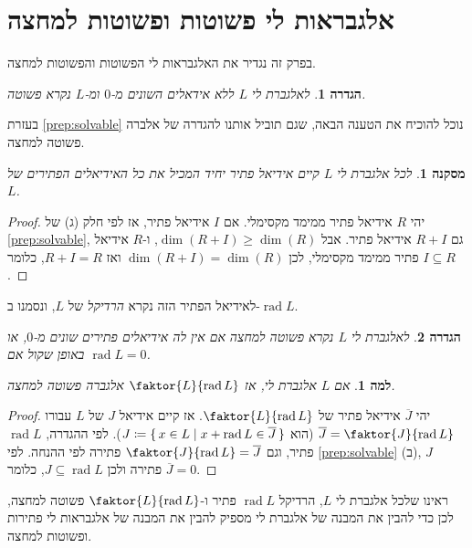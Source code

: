 \documentclass{report}
\theoremstyle{break}
\newtheorem{lemma}[lemma]{למה}
\newtheorem{definition}[definition]{הגדרה}
\newtheorem{corollary}[corollary]{מסקנה}
\theoremstyle{MyNonumberbreak}
\newtheorem{proof}{הוכחה}
\DeclareMathOperator{\rad}{rad} %
\begin{document}
\section{אלגבראות לי פשוטות ופשוטות למחצה}
בפרק זה נגדיר את האלגבראות לי הפשוטות והפשוטות למחצה.
\begin{definition}
	לאלגברת לי $L$ ללא אידאלים השונים מ-$0$ ומ-$L$ נקרא \textit{פשוטה}.
\end{definition}
בעזרת \autoref*{prep:solvable} נוכל להוכיח את הטענה הבאה, שגם תוביל אותנו להגדרה של אלברה פשוטה למחצה.
\begin{corollary} \label{cor:radical}
	לכל אלגברת לי $L$ קיים אידיאל פתיר יחיד המכיל את כל האידיאלים הפתירים של $L$.
\end{corollary}
\begin{proof}
	יהי $R$ אידיאל פתיר ממימד מקסימלי. אם $I$ אידיאל פתיר, אז לפי חלק (ג) של \autoref*{prep:solvable}, גם $R+I$ אידיאל פתיר. אבל $\dim(R + I) \ge \dim(R)$, ו-$R$ אידיאל פתיר ממימד מקסימלי, לכן $\dim(R + I) = \dim(R)$ ואז $R + I = R$, כלומר $I \subseteq R$.
\end{proof}
לאידיאל הפתיר הזה נקרא \textit{הרדיקל} של $L$, ונסמנו ב-$\rad L$.
\begin{definition} \label{def:semisimple}
	לאלגברת לי $L$ נקרא \textit{פשוטה למחצה} אם אין לה אידיאלים פתירים שונים מ-$0$, או באופן שקול אם $\rad L = 0$.
\end{definition}
\begin{lemma}
	אם $L$ אלגברת לי, אז $\faktor{L}{\rad L}$ אלגברה פשוטה למחצה.
\end{lemma}
\begin{proof}
	יהי $\overline{J}$ אידיאל פתיר של $\faktor{L}{\rad L}$. אז קיים אידיאל $J$ של $L$ עבורו $\overline{J} = \faktor{J}{\rad L}$ (הוא $J \coloneqq \set{x \in L | x  + \rad L \in \overline{J}}$). לפי ההגדרה, $\rad L$ פתיר, וגם $\faktor{J}{\rad L} = \overline{J}$ פתירה לפי ההנחה. לפי \autoref*{prep:solvable} (ב), $J$ פתירה ולכן $J \subseteq \rad L$, כלומר $\overline{J} = 0$.
\end{proof}
ראינו שלכל אלגברת לי $L$, הרדיקל $\rad L$ פתיר ו-$\faktor{L}{\rad L}$ פשוטה למחצה, לכן כדי להבין את המבנה של אלגברת לי מספיק להבין את המבנה של אלגבראות לי פתירות ופשוטות למחצה.
\end{document}
